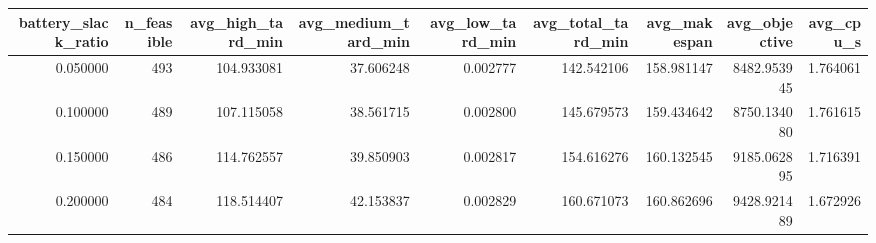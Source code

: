 \begin{tabular}{rrrrrrrrr}
\toprule
battery_slack_ratio & n_feasible & avg_high_tard_min & avg_medium_tard_min & avg_low_tard_min & avg_total_tard_min & avg_makespan & avg_objective & avg_cpu_s \\
\midrule
0.050000 & 493 & 104.933081 & 37.606248 & 0.002777 & 142.542106 & 158.981147 & 8482.953945 & 1.764061 \\
0.100000 & 489 & 107.115058 & 38.561715 & 0.002800 & 145.679573 & 159.434642 & 8750.134080 & 1.761615 \\
0.150000 & 486 & 114.762557 & 39.850903 & 0.002817 & 154.616276 & 160.132545 & 9185.062895 & 1.716391 \\
0.200000 & 484 & 118.514407 & 42.153837 & 0.002829 & 160.671073 & 160.862696 & 9428.921489 & 1.672926 \\
\bottomrule
\end{tabular}
